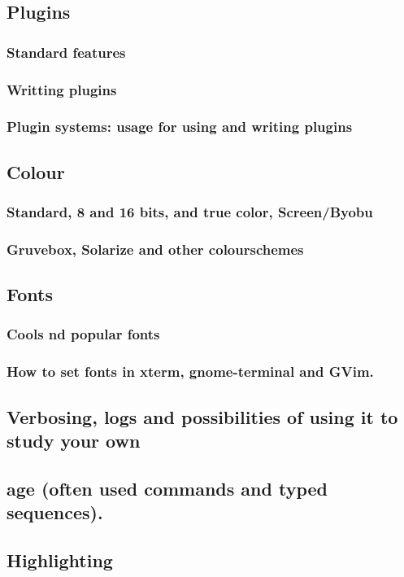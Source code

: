 \documentclass{article}
\begin{document}
\subsection{Plugins}
\subsubsection{Standard features}
\subsubsection{Writting plugins}
\subsubsection{Plugin systems: usage for using and writing plugins}
\subsection{Colour}
\subsubsection{Standard, 8 and 16 bits, and true color, Screen/Byobu}
\subsubsection{Gruvebox, Solarize and other colourschemes}
\subsection{Fonts}
\subsubsection{Cools nd popular fonts}
\subsubsection{How to set fonts in xterm, gnome-terminal and GVim.}
\subsection{Verbosing, logs and possibilities of using it to study your own}
\subsection{age (often used commands and typed sequences).}
\subsection{Highlighting}
\end{document}
